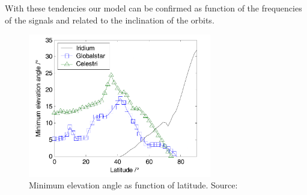 With these tendencies our model can be confirmed as function of the frequencies of the signals and related to the inclination of the orbits. 


\begin{figure}[h]
\includegraphics[width=8cm]{latitudes}
\centering
\caption{Minimum elevation angle as function of latitude. Source: \cite{Li2016}}
\end{figure}
